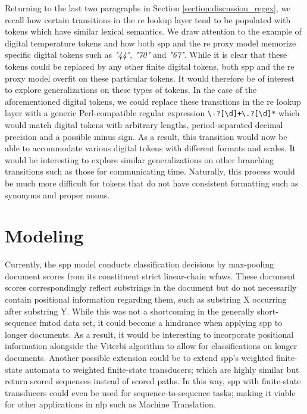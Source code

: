 Returning to the last two paragraphs in Section \ref{section:discussion_regex},
we recall how certain transitions in the \ac{re} lookup layer tend to be
populated with tokens which have similar lexical semantics. We draw attention to
the example of digital temperature tokens and how both \ac{spp} and the \ac{re}
proxy model memorize specific digital tokens such as \textit{"44"},
\textit{"70"} and \textit{"67"}. While it is clear that these tokens could be
replaced by any other finite digital tokens, both \ac{spp} and the \ac{re} proxy
model overfit on these particular tokens. It would therefore be of interest to
explore generalizations on these types of tokens. In the case of the
aforementioned digital tokens, we could replace these transitions in the \ac{re}
lookup layer with a generic Perl-compatible regular expression
\texttt{\textbackslash-?[\textbackslash d]+\textbackslash .?[\textbackslash d]*}
which would match digital tokens with arbitrary lengths, period-separated
decimal precision and a possible minus sign. As a result, this transition would
now be able to accommodate various digital tokens with different formats and
scales. It would be interesting to explore similar generalizations on other
branching transitions such as those for communicating time. Naturally, this
process would be much more difficult for tokens that do not have consistent
formatting such as synonyms and proper nouns.

\section{Modeling}

Currently, the \ac{spp} model conducts classification decisions by max-pooling
document scores from its constituent strict linear-chain \ac{wfaws}. These
document scores correspondingly reflect substrings in the document but do not
necessarily contain positional information regarding them, such as substring
X occurring after substring Y. While this was not a shortcoming in the generally
short-sequence \ac{fmtod} data set, it could become a hindrance when applying \ac{spp}
to longer documents. As a result, it would be interesting to incorporate
positional information alongside the Viterbi algorithm to allow for
classifications on longer documents. Another possible extension could be to
extend \ac{spp}'s weighted finite-state automata to weighted finite-state transducers;
which are highly similar but return scored sequences instead of scored paths.
In this way, \ac{spp} with finite-state transducers could even be used for
sequence-to-sequence tasks; making it viable for other applications in \ac{nlp} such
as Machine Translation.


